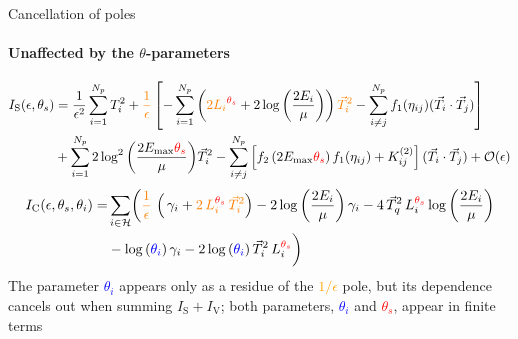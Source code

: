 \begin{frame} {Cancellation of poles}
  \framesubtitle{Unaffected by the $\theta$-parameters}
\begin{equation*}
  \begin{aligned}
  \textcolor{black}{I_{\mathrm{S}} (\epsilon, \theta_s)} &= \frac{1}{\epsilon^2}\sum_{i=1}^{N_p} T_i^2 + \textcolor{orange}{\frac{1}{\epsilon}}\left[-\sum_{i=1}^{N_p}  \left( \textcolor{orange}{2{L_i}^{\textcolor{red}{\theta_s}}} + 2 \log{\left(\frac{2 E_i}{\mu} \right) } \right) \textcolor{orange}{\vec{T}_i^2} - \sum_{i\neq j}^{N_p} f_1(\eta_{ij}) (\vec{T}_i \cdot \vec{T}_j) \right]  \\
  &  + \sum_{i=1}^{N_p} 2 \log^2{\left(\frac{2 E_{\mathrm{max}}\textcolor{red}{\theta_s}}{\mu} \right)}\vec{T}_i^2 - \sum_{i\neq j}^{N_p} \left[ f_2 \left(2 E_{\mathrm{max}}\textcolor{red}{\theta_s}\right) f_1(\eta_{ij}) + K_{ij}^{(2)}\right] (\vec{T}_i \cdot \vec{T}_j) + \mathcal{O}(\epsilon)
  \end{aligned}
  \label{pink}
\end{equation*}
\pause
  \begin{equation*}
  \begin{aligned}
    \textcolor{black}{I_{\mathrm{C}} (\epsilon, \theta_s, \theta_i)} = &\sum_{i \in \mathcal{H}} \biggl( \textcolor{orange}{\frac{1}{\epsilon}}\, \left(\, \gamma_i+  \textcolor{orange}{2 \,L_i^{\textcolor{red}{\theta_s}} \,\vec{T}_i^2} \right) - 2 \log{\left(\frac{2E_i}{\mu}\right)}\, \gamma_i  - 4 \, \vec{T}_q^2 \, L_i^{\textcolor{red}{\theta_s}} \log{\left(\frac{2E_i}{\mu}\right)} \\
    & - \log{(\textcolor{blue}{\theta_i})} \, \gamma_i - 2 \log{(\textcolor{blue}{\theta_i})} \, \vec{T}_i^2 \, L_i^{\textcolor{red}{\theta_s}} \biggr) 
    \label{green}
  \end{aligned}
\end{equation*}
\pause
The parameter \textcolor{blue}{$\theta_i$} appears only as a residue of the \textcolor{orange}{$1/\epsilon$} pole, but its dependence cancels out when summing $I_{\mathrm{S}} + I_{\mathrm{V}}$; both parameters, \textcolor{blue}{$\theta_i$} and \textcolor{red}{$\theta_s$}, appear in finite terms 

\end{frame}


